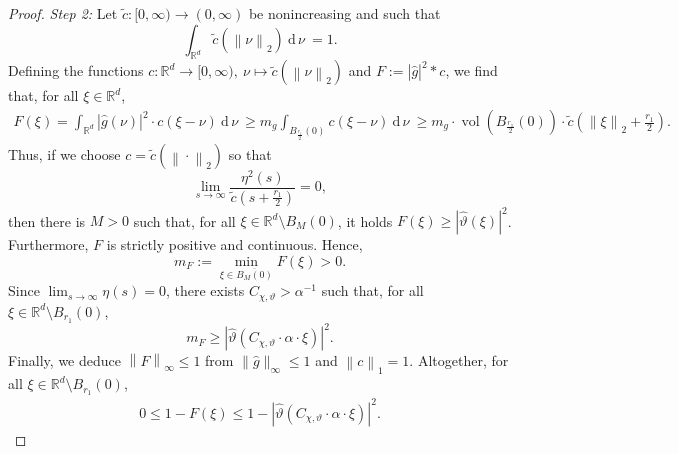 \documentclass[11pt]{amsart}
\newcommand{\R}{{\mathbb{R}}}
\newcommand{\dnu}{\:\mathrm{d}\,\nu\:}
\newcommand{\norm}[1]{\ensuremath{\left\lVert\text{}#1\text{}\right\rVert}}
\DeclareMathOperator{\vol}{vol}
\newenvironment{proof sketch} {\textit{Proof sketch.}}{}
\begin{document}
\begin{proof}
    \textit{Step 2:} Let $\tilde{c}:[0,\infty) \to (0,\infty)$ be nonincreasing and such that \[\int_{\R^d}\tilde{c}(\norm{\nu}_2)\dnu=1.\] Defining the functions $c:\R^d \to [0,\infty), \ \nu \mapsto \tilde{c}(\norm{\nu}_2)$ and $F:=|\widehat{g}|^2*c$, we find that, for all $\xi \in \R^d$,
    \begin{align*}
      F(\xi)=\int_{\R^d}|\widehat{g}(\nu)|^2 \cdot c(\xi-\nu)\dnu 
      \geq m_g \int_{B_{\frac{r_1}{2}}(0)}c(\xi-\nu)\dnu
      \geq m_g \cdot \vol\left(B_{\frac{r_1}{2}}(0)\right) \cdot \tilde{c}\left(\norm{\xi}_2+\frac{r_1}{2}\right).
    \end{align*}
    Thus, if we choose $c=\tilde{c}(\norm{\cdot}_2)$ so that 
    \[\lim_{s \to \infty}\frac{\eta^2(s)}{\tilde{c}\left(s+\frac{r_1}{2}\right)}=0,\] 
    then there is $M>0$ such that, for all $\xi \in \R^d \setminus B_{M}(0)$, it holds $F(\xi) \geq |\widehat{\vartheta}(\xi)|^2$. Furthermore, $F$ is strictly positive and continuous. Hence, 
    \[m_{F}:=\min_{\xi \in \overline{B_{M}(0)}}F(\xi)>0.\] 
    Since $\lim_{s \to \infty}\eta(s)=0$, there exists $C_{\chi,\vartheta}>\alpha^{-1}$ such that, for all $\xi \in \R^d\setminus B_{r_1}(0)$,
    \[m_{F} \geq |\widehat{\vartheta}(C_{\chi,\vartheta} \cdot \alpha \cdot \xi)|^2.\] 
    Finally, we deduce $\norm{F}_{\infty}\leq 1$ from $\|\widehat{g}\|_{\infty}\leq 1$ and $\norm{c}_1=1$. Altogether, for all $\xi \in \R^d\setminus B_{r_1}(0)$,
    \begin{align}\label{eq: Waldspurger-type bound on 1-F}
      0 \leq 1-F(\xi)\leq 1-|\widehat{\vartheta}(C_{\chi,\vartheta} \cdot \alpha \cdot \xi)|^2.
    \end{align}
    

\end{proof}
\end{document}

